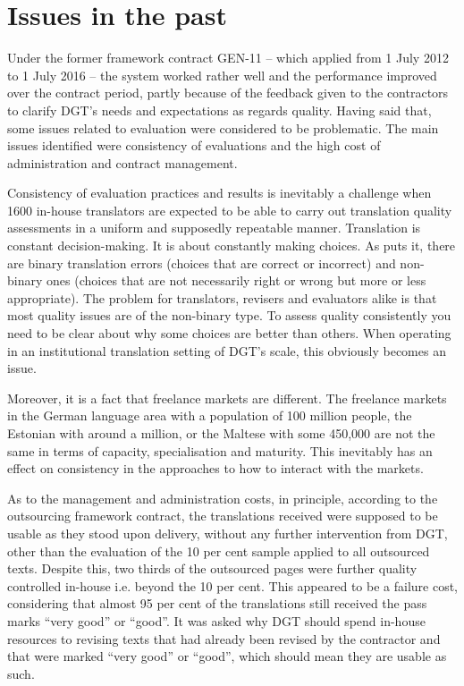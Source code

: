 \documentclass[output=paper]{langsci/langscibook}
\begin{document}
\section{Issues in the past}\label{sec:strandvik:strandvic:3}

Under the former framework contract GEN-11 – which applied from 1 July 2012 to 1 July 2016 – the system worked rather well and the performance improved over the contract period, partly because of the feedback given to the contractors to clarify DGT's needs and expectations as regards quality. Having said that, some issues related to evaluation were considered to be problematic. The main issues identified were consistency of evaluations and the high cost of administration and contract management. 

Consistency of evaluation practices and results is inevitably a challenge when 1600 in-house translators are expected to be able to carry out translation quality assessments in a uniform and supposedly repeatable manner. Translation is constant decision-making. It is about constantly making choices. As \citet{Pym1992} puts it, there are binary translation errors (choices that are correct or incorrect) and non-binary ones (choices that are not necessarily right or wrong but more or less appropriate). The problem for translators, revisers and evaluators alike is that most quality issues are of the non-binary type. To assess quality consistently you need to be clear about why some choices are better than others. When operating in an institutional translation setting of DGT's scale, this obviously becomes an issue. 

Moreover, it is a fact that freelance markets are different. The freelance markets in the German language area with a population of 100 million people, the Estonian with around a million, or the Maltese with some 450,000 are not the same in terms of capacity, specialisation and maturity. This inevitably has an effect on consistency in the approaches to how to interact with the markets.

As to the management and administration costs, in principle, according to the outsourcing framework contract, the translations received were supposed to be usable as they stood upon delivery, without any further intervention from DGT, other than the evaluation of the 10 per cent sample applied to all outsourced texts. Despite this, two thirds of the outsourced pages were further quality controlled in-house i.e. beyond the 10 per cent. This appeared to be a failure cost, considering that almost 95 per cent of the translations still received the pass marks ``very good'' or ``good''. It was asked why DGT should spend in-house resources to revising texts that had already been revised by the contractor and that were marked ``very good'' or ``good'', which should mean they are usable as such.
\end{document}
